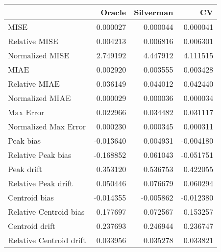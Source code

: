\begin{tabular}{lrrr}
  \hline
 & Oracle & Silverman & CV \\ 
  \hline
MISE & 0.000027 & 0.000044 & 0.000041 \\ 
  Relative MISE & 0.004213 & 0.006816 & 0.006301 \\ 
  Normalized MISE & 2.749192 & 4.447912 & 4.111515 \\ 
  MIAE & 0.002920 & 0.003555 & 0.003428 \\ 
  Relative MIAE & 0.036149 & 0.044012 & 0.042440 \\ 
  Normalized MIAE & 0.000029 & 0.000036 & 0.000034 \\ 
  Max Error & 0.022966 & 0.034482 & 0.031117 \\ 
  Normalized Max Error & 0.000230 & 0.000345 & 0.000311 \\ 
  Peak bias & -0.013640 & 0.004931 & -0.004180 \\ 
  Relative Peak bias & -0.168852 & 0.061043 & -0.051751 \\ 
  Peak drift & 0.353120 & 0.536753 & 0.422055 \\ 
  Relative Peak drift & 0.050446 & 0.076679 & 0.060294 \\ 
  Centroid bias & -0.014355 & -0.005862 & -0.012380 \\ 
  Relative Centroid bias & -0.177697 & -0.072567 & -0.153257 \\ 
  Centroid drift & 0.237693 & 0.246944 & 0.236747 \\ 
  Relative Centroid drift & 0.033956 & 0.035278 & 0.033821 \\ 
   \hline
\end{tabular}
